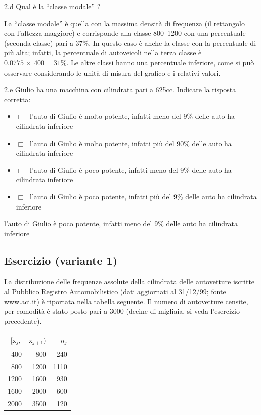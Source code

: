 \documentclass[
  11pt,
]{book}
\providecommand{\tightlist}{%
  \setlength{\itemsep}{0pt}\setlength{\parskip}{0pt}}
\theoremstyle{mytheoremstyle}
\theoremstyle{mydefstyle}
\newenvironment{sol}
  {
  \begin{tcolorbox}[enhanced,breakable,arc=0.1mm,boxrule=1pt,colback=white,colframe=iblue,
  title=\bf \fontfamily{lmss}\selectfont \hspace{.5 cm} Soluzione,drop fuzzy shadow]

}{
\end{tcolorbox}
  }
\begin{document}
2.d Qual è la ``classe modale'' ?

\begin{sol}
La ``classe modale'' è quella con la massima densità di frequenza
(il rettangolo con l'altezza maggiore) e corrisponde alla classe
800--1200 con una percentuale (seconda classe) pari a \(37\%\).
In questo caso è anche la classe con la percentuale di più
alta; infatti, la percentuale di autoveicoli nella terza classe
è \(0.0775 \,\times\, 400 = 31\%\).
Le altre classi hanno una percentuale inferiore, come si può
osservare considerando le unità di misura del grafico e i
relativi valori.

\end{sol}

2.e Giulio ha una macchina con cilindrata pari a 625cc. Indicare la risposta corretta:

\begin{itemize}
\tightlist
\item
  \(\Box \;\) l'auto di Giulio è molto potente, infatti meno del 9\% delle auto ha cilindrata inferiore
\item
  \(\Box \;\) l'auto di Giulio è molto potente, infatti più del 90\% delle auto ha cilindrata inferiore
\item
  \(\Box \;\) l'auto di Giulio è poco potente, infatti meno del 9\% delle auto ha cilindrata inferiore
\item
  \(\Box \;\) l'auto di Giulio è poco potente, infatti più del 9\% delle auto ha cilindrata inferiore
\end{itemize}

\begin{sol}
l'auto di Giulio è poco potente, infatti meno del 9\% delle auto ha cilindrata inferiore

\end{sol}

\subsection{Esercizio (variante 1)}\label{esercizio-variante-1}

La distribuzione delle frequenze assolute della cilindrata
delle autovetture iscritte al Pubblico Registro Automobilistico
(dati aggiornati al 31/12/99; fonte www.aci.it) è riportata
nella tabella seguente.
Il numero di autovetture censite, per comodità è stato posto
pari a 3000 (decine di migliaia, si veda l'esercizio precedente).

\begin{tabular}{rrr}
\toprule
$[\text{x}_j,$ & $\text{x}_{j+1})$ & $n_j$\\
\midrule
400 & 800 & 240\\
800 & 1200 & 1110\\
1200 & 1600 & 930\\
1600 & 2000 & 600\\
2000 & 3500 & 120\\
\bottomrule
\end{tabular}
\end{document}

